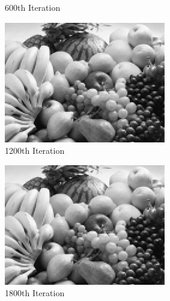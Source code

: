 \documentclass{paper}
\begin{document}
\begin{enumerate}
\begin{figure}[]
\begin{center}
\begin{subfigure}[b]{0.49\textwidth}
                \caption{600th Iteration}
        \end{subfigure}
        \begin{subfigure}[b]{0.49\textwidth}
                \includegraphics[width=\textwidth]{it1200}
                \caption{1200th Iteration}
        \end{subfigure}
        \begin{subfigure}[b]{0.49\textwidth}
                \includegraphics[width=\textwidth]{it1800}
                \caption{1800th Iteration}
        \end{subfigure}
        \begin{subfigure}[b]{0.49\textwidth}

\end{subfigure}
\end{center}
\end{figure}
\end{enumerate}
\end{document}
